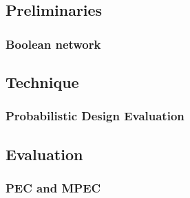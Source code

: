 \subsection{Preliminaries}
\begin{frame}
  \frametitle{Boolean network}
\end{frame}
\subsection{Technique}
\begin{frame}
  \frametitle{Probabilistic Design Evaluation}
\end{frame}
\subsection{Evaluation}
\begin{frame}
  \frametitle{PEC and MPEC}
\end{frame}